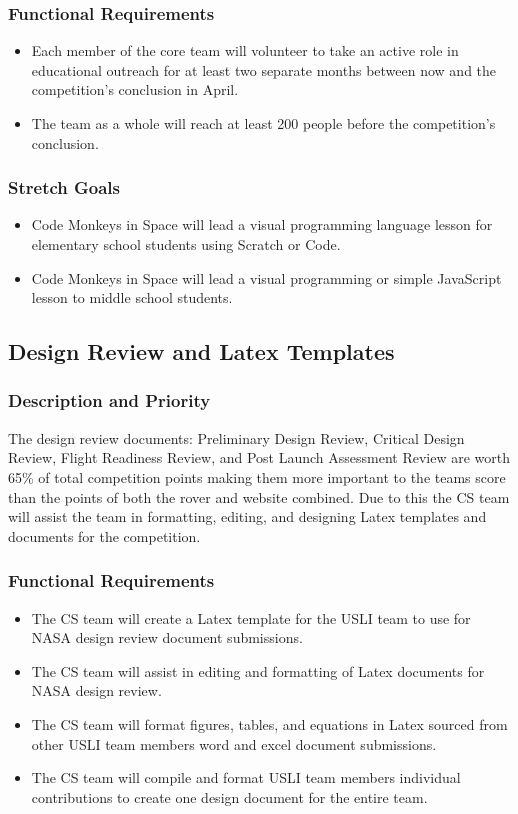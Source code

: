 \documentclass[onecolumn, draftclsnofoot, 10pt, compsoc]{IEEEtran}
\begin{document}
\subsubsection{Functional Requirements}
\begin{itemize}
\item Each member of the core team will volunteer to take an active role in educational outreach for at least two separate months between now and the competition's conclusion in April.
\item The team as a whole will reach at least 200 people before the competition's conclusion.
\end{itemize}
\subsubsection{Stretch Goals}
\begin{itemize}
\item Code Monkeys in Space will lead a visual programming language lesson for elementary school students using Scratch or Code.
\item Code Monkeys in Space will lead a visual programming or simple JavaScript lesson to middle school students.
\end{itemize}

\subsection{Design Review and Latex Templates}
\subsubsection{Description and Priority}
The design review documents: Preliminary Design Review, Critical Design Review, Flight Readiness Review, and Post Launch Assessment Review are worth 65\% of total competition points making them more important to the teams score than the points of both the rover and website combined. Due to this the CS team will assist the team in formatting, editing, and designing Latex templates and documents for the competition. 
\subsubsection{Functional Requirements}
\begin{itemize}
\item The CS team will create a Latex template for the USLI team to use for NASA design review document submissions.
\item The CS team will assist in editing and formatting of Latex documents for NASA design review.
\item The CS team will format figures, tables, and equations in Latex sourced from other USLI team members word and excel document submissions.
\item The CS team will compile and format USLI team members individual contributions to create one design document for the entire team.
\end{itemize}
\end{document}
